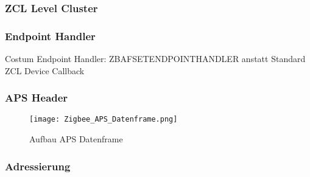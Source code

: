 \subsubsection{ZCL Level Cluster}\label{subsubsec:ZCLLevelCluster}

\subsubsection{Endpoint Handler}\label{subsubsec:EndpointHandler}

Costum Endpoint Handler: ZBAFSETENDPOINTHANDLER anstatt Standard ZCL Device Callback

\subsubsection{APS Header}\label{subsubsec:Header}


\begin{figure}[h]
	\centering
	\texttt{[image: Zigbee\_APS\_Datenframe.png]}
	\caption{Aufbau APS Datenframe \cite{markus_krause_rainer_konrad_drahtlose_2014}}
	\label{fig:KonkurrenzIEEEundWLANFunkkanäle}
\end{figure}


\subsubsection{Adressierung}\label{subsubsec:Adressierung}

